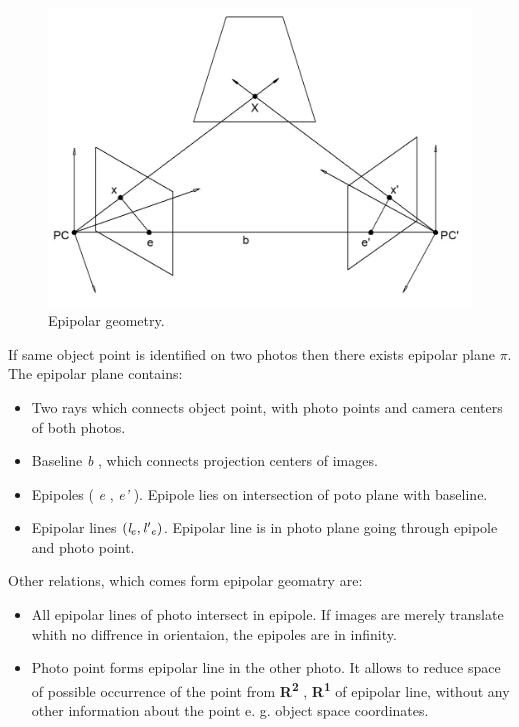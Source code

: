 \documentclass[a4paper,12pt]{article}
\newcommand{\escal}[1]{
{\it #1}
}
\newcommand{\eucl}[1]{
{\bf R\textsuperscript{#1}}
}
\begin{document}
\begin{figure}[h]
    \centering
    \includegraphics[scale=0.3]{figures/epipolar.png}
    \caption{Epipolar geometry.}
    \label{fig:epipolae}
\end{figure}

If same object point is identified on two photos then there exists epipolar plane $\pi$.
The epipolar plane contains:

\begin{itemize}
\item Two rays which connects object point, with photo points and camera centers of both photos.
\item Baseline \escal{b}, which connects projection centers of images.
\item Epipoles (\escal{e}, \escal{e'}). Epipole lies on intersection of poto plane with baseline.
\item Epipolar lines  $(\escal{l}_{e}, \escal{l'}_{e})$. Epipolar line is in photo plane going through epipole and photo point.
\end{itemize}


Other relations, which comes form epipolar geomatry are:

\begin{itemize}
\item All epipolar lines of  photo intersect in epipole. If images are merely translate whith no diffrence in orientaion, 
the epipoles are in infinity.
\item Photo point forms epipolar line in the other photo. It allows to reduce space of possible occurrence of the point 
      from \eucl{2}, \eucl{1} of epipolar line, without any other information about the point e. g. object space coordinates. 
\end{itemize}
\end{document}
